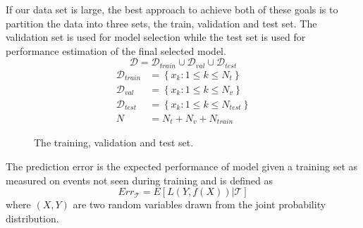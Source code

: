 If our data set is large, the best approach to achieve both of these goals is to partition the data into three sets, the train, validation and test set.  The validation set is used for model selection while the test set is used for performance estimation of the final selected model.
\begin{equation}
\mathcal{D} = \mathcal{D}_{train} \cup \mathcal{D}_{val} \cup \mathcal{D}_{test}
\end{equation}
\begin{align}
\mathcal{D}_{train} &= \left\{x_k : 1 \leq k \leq N_t \right\} \\
\mathcal{D}_{val} &= \left\{x_k : 1 \leq k \leq N_v \right\} \\
\mathcal{D}_{test} &= \left\{x_k : 1 \leq k \leq N_{test} \right\} \\
N &= N_t + N_v + N_{train}
\end{align}

\begin{center}
\begin{figure}
   \missingfigure{}
   \label{fig:test0}
   \caption{The training, validation and test set.}
\end{figure}
\end{center}





The prediction error is the expected performance of model given a training set as measured on events not seen during training and is defined as
\begin{equation}
Err_{\mathcal{T}} = E\left[L(Y,f(X)) | \mathcal{T} \right]
\end{equation}
where $(X, Y)$ are two random variables drawn from the joint probability distribution.

